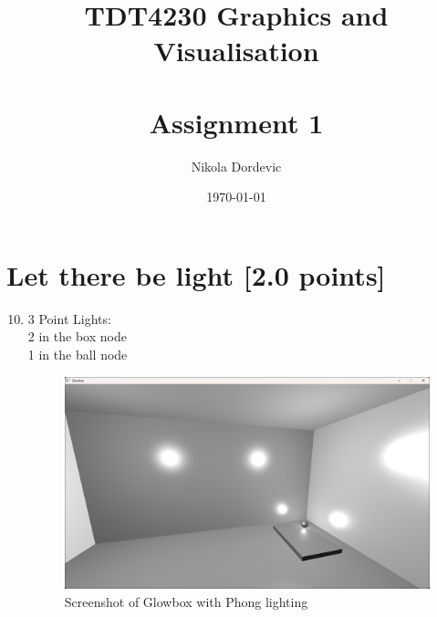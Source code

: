 \documentclass[11pt,a4paper]{report}
\title{TDT4230 Graphics and Visualisation \\\\ Assignment 1}
\author{Nikola Dordevic}
\date{\today}
\begin{document}
\section{Let there be light [2.0 points]}
\begin{enumerate}[label=(\alph*)]\setcounter{enumi}{9}
	\item 3 Point Lights: \\ \hspace*{5mm} 2 in the box node \\ \hspace*{5mm} 1 in the ball node
	
	
	\begin{figure}[h]
		\centering
		\includegraphics[width=\textwidth]{images/task1j.png}
		\caption{Screenshot of Glowbox with Phong lighting}
	\end{figure}
	
	
	
\end{enumerate}

\clearpage

\section{}
\end{document}
